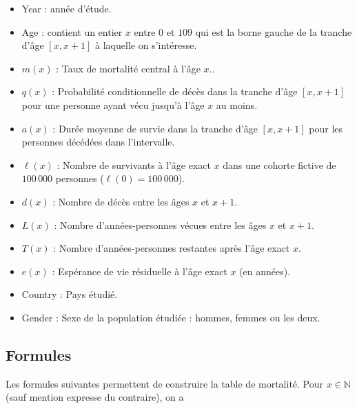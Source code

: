 \documentclass{article}
\def\N{\mathbb{N}}
\begin{document}
\begin{itemize}

\item Year : année d'étude.

\item Age : contient un entier $x$ entre $0$ et $109$ qui est la borne gauche de la tranche d'âge $[x,x+1]$ à laquelle on s'intéresse.

\item $m(x)$ : Taux de mortalité central à l'âge $x$..

\item $q(x)$ : Probabilité conditionnelle de décès dans la tranche d'âge $[x,x+1]$ pour une personne ayant vécu jusqu'à l'âge $x$ au moins.

\item $a(x)$ : Durée moyenne de survie dans la tranche d'âge $[x,x+1]$ pour les personnes décédées dans l'intervalle.

\item $\ell(x)$ : Nombre de survivants à l'âge exact $x$ dans une cohorte fictive de $100\,000$ personnes ($\ell(0) = 100\, 000$).

\item $d(x)$ : Nombre de décès entre les âges $x$ et $x+1$.

\item $L(x)$ : Nombre d'années-personnes vécues entre les âges $x$ et $x+1$.

\item $T(x)$ : Nombre d'années-personnes restantes après l'âge exact $x$.

\item $e(x)$ : Espérance de vie résiduelle à l'âge exact $x$ (en années).

\item Country : Pays étudié.

\item Gender : Sexe de la population étudiée : hommes, femmes ou les deux.

\end{itemize}


\subsection{Formules}

\noindent Les formules suivantes permettent de construire la table de mortalité. Pour $x\in\N$ (sauf mention expresse du contraire), on a

\vspace{0.4cm}
\end{document}
